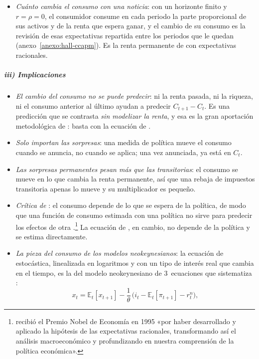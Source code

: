 \documentclass[11pt]{article}
\begin{document}
\begin{itemize}
\item \emph{Cuánto cambia el consumo con una noticia}: con un horizonte finito y $r=\rho=0$, el consumidor consume en cada periodo la parte proporcional de sus activos y de la renta que espera ganar, y el cambio de su consumo es la revisión de esas expectativas repartida entre los periodos que le quedan (anexo~\ref{anexo:hall-ccapm}). Es la renta permanente de  con expectativas racionales.
\end{itemize}

\subparagraph{iii) Implicaciones}

\begin{itemize}
\item \emph{El cambio del consumo no se puede predecir}: ni la renta pasada, ni la riqueza, ni el consumo anterior al último ayudan a predecir $C_{t+1}-C_t$. Es una predicción que se contrasta \emph{sin modelizar la renta}, y esa es la gran aportación metodológica de : basta con la ecuación de .
\item \emph{Solo importan las sorpresas}: una medida de política mueve el consumo cuando se anuncia, no cuando se aplica; una vez anunciada, ya está en $C_t$.
\item \emph{Las sorpresas permanentes pesan más que las transitorias}: el consumo se mueve en lo que cambia la renta permanente, así que una rebaja de impuestos transitoria apenas lo mueve y su multiplicador es pequeño.
\item \emph{Crítica de }: el consumo depende de lo que se espera de la política, de modo que una función de consumo estimada con una política no sirve para predecir los efectos de otra .\footnote{ recibió el Premio Nobel de Economía en 1995 «por haber desarrollado y aplicado la hipótesis de las expectativas racionales, transformando así el análisis macroeconómico y profundizando en nuestra comprensión de la política económica»\nocite{NobelPrize1995Lucas}.} La ecuación de , en cambio, no depende de la política y se estima directamente.
\item \emph{La pieza del consumo de los modelos neokeynesianos}: la ecuación de  estocástica, linealizada en logaritmos y con un tipo de interés real que cambia en el tiempo, es la  del modelo neokeynesiano de 3~ecuaciones que sistematiza \textcite{Woodford2003Interest} :
  \begin{equation*}
  x_t=\mathbb{E}_t[x_{t+1}]-\frac{1}{\theta}\,\big(i_t-\mathbb{E}_t[\pi_{t+1}]-r^n_t\big),

\end{equation*}
\end{itemize}
\end{document}
